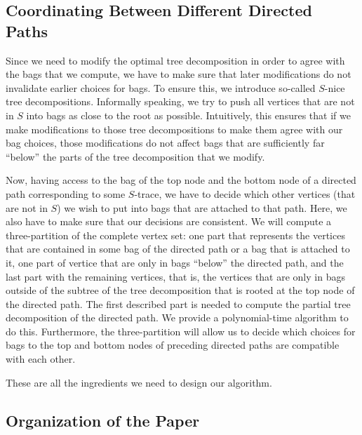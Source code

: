 \documentclass[a4paper,UKenglish,cleveref, autoref, thm-restate, numberwithinsect]{lipics-v2021}
\newcounter{modification}
\newcounter{algorithm}
\newcommand{\slim}{\text{slim}\xspace}
\newcommand{\topheavy}{\text{top-heavy}\xspace}
\begin{document}
\subsection{Coordinating Between Different Directed Paths}

Since we need to modify the optimal tree decomposition in order to agree with the bags that we compute, we have to make sure that later modifications do not invalidate earlier choices for bags. To ensure this, we introduce so-called \emph{\topheavy} \slim $S$-nice tree decompositions. Informally speaking, we try to push all vertices that are not in $S$ into bags as close to the root as possible. Intuitively, this ensures that if we make modifications to those tree decompositions to make them agree with our bag choices, those modifications do not affect bags that are sufficiently far ``below'' the parts of the tree decomposition that we modify.

Now, having access to the bag of the top node and the bottom node of a directed path corresponding to some $S$-trace, we have to decide which other vertices (that are not in $S$) we wish to put into bags that are attached to that path. Here, we also have to make sure that our decisions are consistent. We will compute a three-partition of the complete vertex set: one part that represents the vertices that are contained in some bag of the directed path or a bag that is attached to it, one part of vertice that are only in bags ``below'' the directed path, and the last part with the remaining vertices, that is, the vertices that are only in bags outside of the subtree of the tree decomposition that is rooted at the top node of the directed path.
The first described part is needed to compute the partial tree decomposition of the directed path. We provide a polynomial-time algorithm to do this.
Furthermore, the three-partition will allow us to decide which choices for bags to the top and bottom nodes of preceding directed paths are compatible with each other. 

These are all the ingredients we need to design our algorithm.

\subsection{Organization of the Paper}
\end{document}
